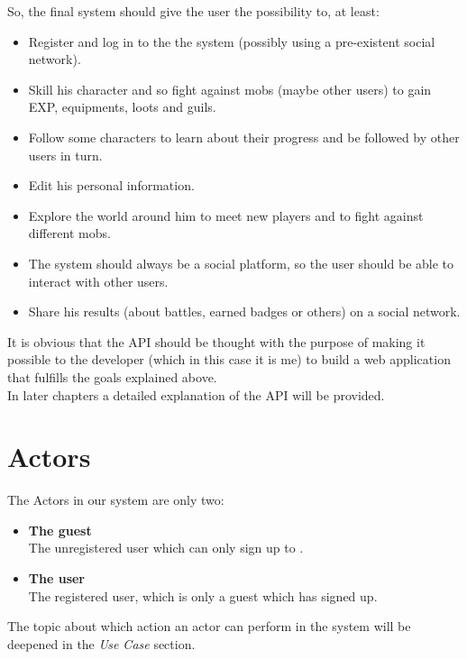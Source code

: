 	So, the final system should give the user the possibility to, at least:
	\newcommand{\goalSignup}{Register and log in to the the system (possibly using a pre-existent social network).}
	\newcommand{\goalSkill}{Skill his character and so fight against mobs (maybe other users) to gain
			EXP, equipments, loots and guils.}
	\newcommand{\goalFollow}{Follow some characters to learn about their progress and be followed by other users in turn.}
	\newcommand{\goalProfile}{Edit his personal information.}
	\newcommand{\goalExplore}{Explore the world around him to meet new players and to fight against different mobs.}
	\newcommand{\goalSocial}{The system should always be a social platform, so the user should be able to 
			interact with other users.}
	\newcommand{\goalShare}{Share his results (about battles, earned badges or others) on a social network.}
	\begin{itemize}
		\item \goalSignup
		\item \goalSkill
		\item \goalFollow
		\item \goalProfile
		\item \goalExplore
		\item \goalSocial
		\item \goalShare
	\end{itemize}

	It is obvious that the API should be thought with the purpose of making it possible to the developer 
	(which in this case it is me) to build a web application that fulfills the goals explained above.\\
	In later chapters a detailed explanation of the API will be provided.

	\section{Actors}
	The Actors in our system are only two:
	\begin{itemize}
		\item \textbf{The guest}\\
		The unregistered user which can only sign up to \SocialBattle.
		\item \textbf{The user}\\
		The registered user, which is only a guest which has signed up.
	\end{itemize}
	The topic about which action an actor can perform in the system will be deepened in the \textit{Use Case} section.
